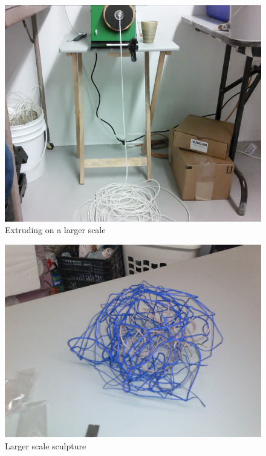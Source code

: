 \begin{figure}[h!]
\centering
\includegraphics[width=\hsize]{art/extruding.png}
\caption{\label{fig:art_2} Extruding on a larger scale }
\end{figure}

\begin{figure}[h!]
\centering
\includegraphics[width=\hsize]{art/CAM00454.jpg}
\caption{\label{fig:art_1} Larger scale sculpture }
\end{figure}



